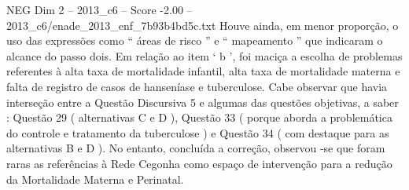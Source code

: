 \begin{textsample}{NEG Dim 2 – 2013\_c6 – Score -2.00 – 2013\_c6/enade\_2013\_enf\_7b93b4bd5c.txt}
Houve ainda, em menor proporção, o uso das expressões como “ áreas de risco ” e “ mapeamento ” que indicaram o alcance do passo dois.
Em relação ao item ‘ b ’, foi maciça a escolha de problemas referentes à alta taxa de mortalidade infantil, alta taxa de mortalidade materna e falta de registro de casos de hanseníase e tuberculose.
Cabe observar que havia interseção entre a Questão Discursiva 5 e algumas das questões objetivas, a saber : Questão 29 ( alternativas C e D ), Questão 33 ( porque aborda a problemática do controle e tratamento da tuberculose ) e Questão 34 ( com destaque para as alternativas B e D ).
No entanto, concluída a correção, observou -se que foram raras as referências à Rede Cegonha como espaço de intervenção para a redução da Mortalidade Materna e Perinatal.

\end{textsample}

